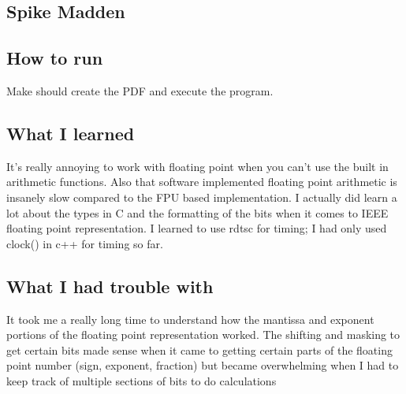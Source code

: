 \documentclass[letterpaper,10pt,titlepage]{article}
\begin{document}
\subsection*{Spike Madden\\}

\subsection*{How to run}
Make should create the PDF and execute the program.

\subsection*{What I learned}
It's really annoying to work with floating point when you can't use the built in arithmetic functions. Also that software implemented floating point arithmetic is insanely slow compared to the FPU based implementation. I actually did learn a lot about the types in C and the formatting of the bits when it comes to IEEE floating point representation. I learned to use rdtsc for timing; I had only used clock() in c++ for timing so far.

\subsection*{What I had trouble with}
It took me a really long time to understand how the mantissa and exponent portions of the floating point representation worked. The shifting and masking to get certain bits made sense when it came to getting certain parts of the floating point number (sign, exponent, fraction)  but became overwhelming when I had to keep track of multiple sections of bits to do calculations
\end{document}
